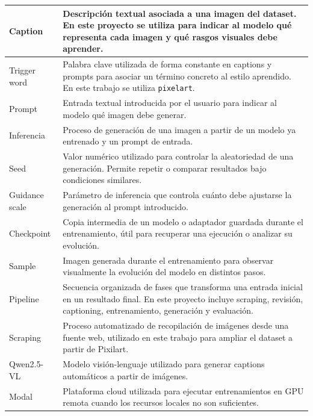\documentclass[a4paper,11pt,titlepage]{scrbook}
\begin{document}
\begin{longtable}{|L{0.25\textwidth}|L{0.65\textwidth}|}
Caption & Descripción textual asociada a una imagen del dataset. En este proyecto se utiliza para indicar al modelo qué representa cada imagen y qué rasgos visuales debe aprender. \\
\hline

Trigger word & Palabra clave utilizada de forma constante en captions y prompts para asociar un término concreto al estilo aprendido. En este trabajo se utiliza \texttt{pixelart}. \\
\hline

Prompt & Entrada textual introducida por el usuario para indicar al modelo qué imagen debe generar. \\
\hline

Inferencia & Proceso de generación de una imagen a partir de un modelo ya entrenado y un prompt de entrada. \\
\hline

Seed & Valor numérico utilizado para controlar la aleatoriedad de una generación. Permite repetir o comparar resultados bajo condiciones similares. \\
\hline

Guidance scale & Parámetro de inferencia que controla cuánto debe ajustarse la generación al prompt introducido. \\
\hline

Checkpoint & Copia intermedia de un modelo o adaptador guardada durante el entrenamiento, útil para recuperar una ejecución o analizar su evolución. \\
\hline

Sample & Imagen generada durante el entrenamiento para observar visualmente la evolución del modelo en distintos pasos. \\
\hline

Pipeline & Secuencia organizada de fases que transforma una entrada inicial en un resultado final. En este proyecto incluye scraping, revisión, captioning, entrenamiento, generación y evaluación. \\
\hline

Scraping & Proceso automatizado de recopilación de imágenes desde una fuente web, utilizado en este trabajo para ampliar el dataset a partir de Pixilart. \\
\hline

Qwen2.5-VL & Modelo visión-lenguaje utilizado para generar captions automáticos a partir de imágenes. \\
\hline

Modal & Plataforma cloud utilizada para ejecutar entrenamientos en GPU remota cuando los recursos locales no son suficientes. \\
\hline


\end{longtable}
\end{document}
